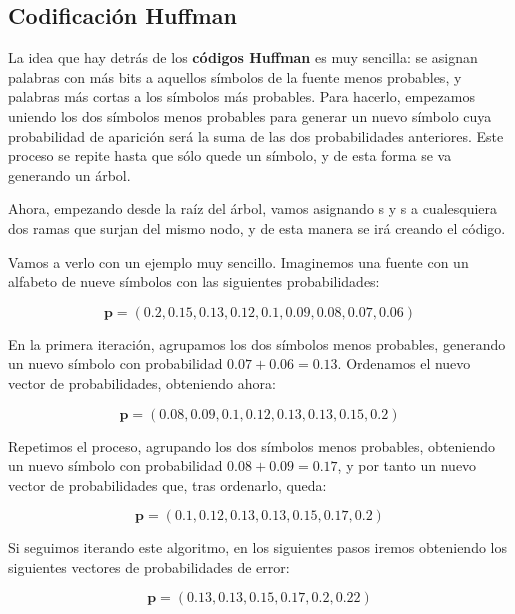 \documentclass[es,apuntes]{uah}
\begin{document}
\subsection{Codificación Huffman}

La idea que hay detrás de los {\bf códigos Huffman} es muy sencilla: se asignan palabras con más bits a aquellos símbolos de la fuente menos probables, y palabras más cortas a los símbolos más probables. Para hacerlo, empezamos uniendo los dos símbolos menos probables para generar un nuevo símbolo cuya probabilidad de aparición será la suma de las dos probabilidades anteriores. Este proceso se repite hasta que sólo quede un símbolo, y de esta forma se va generando un árbol. 


Ahora, empezando desde la raíz del árbol, vamos asignando s y s a cualesquiera dos ramas que surjan del mismo nodo, y de esta manera se irá creando el código. 

Vamos a verlo con un ejemplo muy sencillo. Imaginemos una fuente con un alfabeto de nueve símbolos con las siguientes probabilidades: 

\begin{displaymath}
\mathbf{p} = (0.2, 0.15, 0.13, 0.12, 0.1, 0.09, 0.08, 0.07, 0.06)
\end{displaymath}

En la primera iteración, agrupamos los dos símbolos menos probables, generando un nuevo símbolo con probabilidad $0.07 + 0.06 = 0.13$. Ordenamos el nuevo vector de probabilidades, obteniendo ahora:

\begin{displaymath}
	\mathbf{p} = (0.08, 0.09, 0.1, 0.12, 0.13, 0.13, 0.15, 0.2)
\end{displaymath}

Repetimos el proceso, agrupando los dos símbolos menos probables, obteniendo un nuevo símbolo con probabilidad $0.08 + 0.09 = 0.17$, y por tanto un nuevo vector de probabilidades que, tras ordenarlo, queda:

\begin{displaymath}
	\mathbf{p} = (0.1, 0.12, 0.13, 0.13, 0.15, 0.17, 0.2)
\end{displaymath}

Si seguimos iterando este algoritmo, en los siguientes pasos iremos obteniendo los siguientes vectores de probabilidades de error:

\begin{displaymath}
	\mathbf{p} = (0.13, 0.13, 0.15, 0.17, 0.2, 0.22)
\end{displaymath}
\end{document}
